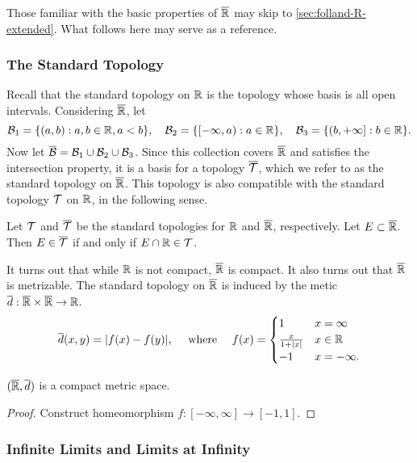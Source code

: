 \documentclass[12pt]{article} %
\begin{document}
Those familiar with the basic properties of $\overline{\mathbb{R}}$ may skip to \cref{sec:folland-R-extended}. What follows here may serve as a reference.

\subsubsection{The Standard Topology}

Recall that the standard topology on $\mathbb{R}$ is the topology whose basis is all open intervals. Considering $\overline{\mathbb{R}}$, let \[\mathcal{B}_1 = \{(a, b) :  a, b \in \mathbb{R}, a < b\}, \ \ \ \mathcal{B}_2 = \{[-\infty, a) : a \in \mathbb{R}\}, \ \ \ \mathcal{B}_3 = \{(b, + \infty] : b \in \mathbb{R}\}.\] Now let $\overline{\mathcal{B}} = \mathcal{B}_1 \cup \mathcal{B}_2 \cup \mathcal{B}_3$. Since this collection covers $\overline{\mathbb{R}}$ and satisfies the intersection property, it is a basis for a topology $\overline{\mathcal{T}}$, which we refer to as the standard topology on $\overline{\mathbb{R}}$. This topology is also compatible with the standard topology $\mathcal{T}$ on $\mathbb{R}$, in the following sense.

\begin{proposition}
    Let $\mathcal{T}$ and $\overline{\mathcal{T}}$ be the standard topologies for $\mathbb{R}$ and $\overline{\mathbb{R}}$, respectively. Let $E \subset \overline{\mathbb{R}}$. Then $E \in \overline{\mathcal{T}}$ if and only if $E \cap \mathbb{R} \in \mathcal{T}$.
\end{proposition}

It turns out that while $\mathbb{R}$ is not compact, $\overline{\mathbb{R}}$ is compact. It also turns out that $\overline{\mathbb{R}}$ is metrizable. The standard topology on $\overline{\mathbb{R}}$ is induced by the metic $\overline{d} : \overline{\mathbb{R}} \times \overline{\mathbb{R}} \to \mathbb{R}$.\[\overline{d}(x, y) = |f(x) - f(y)|, \ \ \ \ \text{where} \ \ \ \ f(x) = \begin{cases}
    1 &x = \infty\\
    \frac{x}{1+|x|} &x \in \mathbb{R}\\
    -1 &x = -\infty.
\end{cases}\]

\begin{proposition}
    $(\overline{\mathbb{R}}, \overline{d})$ is a compact metric space.
\end{proposition}

\begin{proof}
    Construct homeomorphism $f : [-\infty, \infty] \to [-1,1]$.
\end{proof}

\subsubsection{Infinite Limits and Limits at Infinity}
\end{document}
